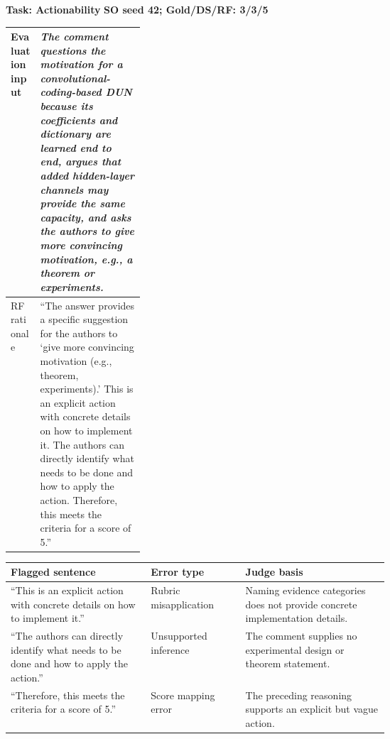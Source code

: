 \begin{table}[!t]
\hfuzz=2pt
\centering
\begin{minipage}{\textwidth}
\normalsize\linespread{1.05}\selectfont
\renewcommand{\arraystretch}{1.08}
\textbf{Task: Actionability}\hfill
\textbf{SO seed 42; Gold/DS/RF: 3/3/5}\\[2pt]
\begin{tabularx}{0.99\linewidth}{@{}>{\raggedright\arraybackslash}p{0.22\linewidth}X@{}}
\toprule
Evaluation input & \textit{The comment questions the motivation for a
convolutional-coding-based DUN because its coefficients and dictionary are
learned end to end, argues that added hidden-layer channels may provide the same
capacity, and asks the authors to give more convincing motivation, e.g., a
theorem or experiments.} \\
\midrule
RF rationale & ``The answer provides a specific suggestion for the authors to
`give more convincing motivation (e.g., theorem, experiments).' This is an
explicit action with concrete details on how to implement it. The authors can
directly identify what needs to be done and how to apply the action. Therefore,
this meets the criteria for a score of 5.'' \\
\bottomrule
\end{tabularx}
\vspace{2pt}
\begin{tabularx}{\linewidth}{@{}>{\raggedright\arraybackslash}p{0.37\linewidth}>{\raggedright\arraybackslash}p{0.25\linewidth}X@{}}
\toprule
Flagged sentence & Error type & Judge basis \\
\midrule
``This is an explicit action with concrete details on how to implement it.'' &
Rubric misapplication & Naming evidence categories does not provide concrete
implementation details. \\
``The authors can directly identify what needs to be done and how to apply the
action.'' & Unsupported inference & The comment supplies no experimental design
or theorem statement. \\
``Therefore, this meets the criteria for a score of 5.'' & Score mapping error &
The preceding reasoning supports an explicit but vague action. \\
\bottomrule
\end{tabularx}
\captionsetup{hypcap=false}
\label{tab:rationale-sentence-example}
\end{minipage}
\vspace{0.8\baselineskip}

\end{table}
